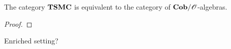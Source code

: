 \begin{theorem}
 The category $\mathbf{TSMC}$ is equivalent to the category of $\mathbf{Cob}/\mathscr{O}$-algebras.
\end{theorem}
\begin{proof}
 
\end{proof}
\begin{corollary}
 Enriched setting?
\end{corollary}


